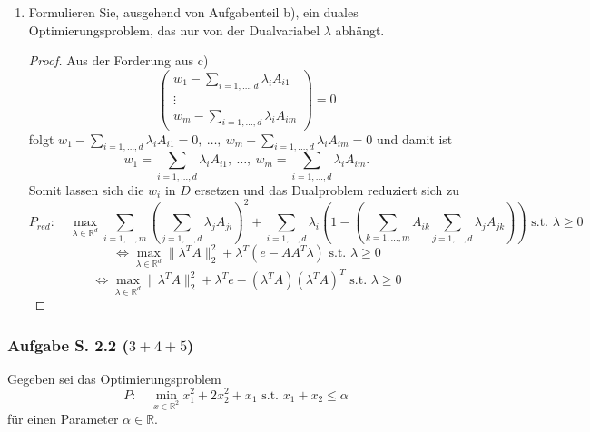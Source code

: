 \documentclass[12pt]{extreport} %
\newcommand{\R}{\mathbb{R}}
\theoremstyle{named}
\theoremstyle{nnamed}
\theoremstyle{itshape}
\theoremstyle{normal}
\begin{document}
\begin{enumerate}
\begin{proof}
			$$ \text{ und } \left(\begin{array}{c} w_1 -\sum_{i=1,\dotsc,d}  \lambda_i A_{i1}  \\ \vdots \\ w_m -\sum_{i=1,\dotsc,d}  \lambda_i A_{im} \end{array}\right) = 0 $$
		\end{proof}
	\item Formulieren Sie, ausgehend von Aufgabenteil b), ein duales Optimierungsproblem, das nur von der Dualvariabel $\lambda$ abhängt.
		\begin{proof}
			Aus der Forderung aus c)
			$$ \left(\begin{array}{c} w_1 -\sum_{i=1,\dotsc,d}  \lambda_i A_{i1}  \\ \vdots \\ w_m -\sum_{i=1,\dotsc,d}  \lambda_i A_{im} \end{array}\right)  = 0 $$
			folgt $w_1 -\sum_{i=1,\dotsc,d}  \lambda_i A_{i1} = 0, ~ \dotsc, ~ w_m -\sum_{i=1,\dotsc,d}  \lambda_i A_{im} = 0$ und damit ist $$w_1 = \sum_{i=1,\dotsc,d}  \lambda_i A_{i1}, ~ \dotsc, ~ w_m = \sum_{i=1,\dotsc,d}  \lambda_i A_{im}. $$
			Somit lassen sich die $w_i$ in $D$ ersetzen und das Dualproblem reduziert sich zu
		 	$$ P_{red}: \quad \max_{\lambda \in \R^d} \sum_{i=1, \dotsc,m } \left( \sum_{j=1, \dotsc, d} \lambda_j A_{ji} \right)^2 + \sum_{i = 1, \dotsc, d} \lambda_i \left( 1 - \left(\sum_{k = 1, \dotsc, m} A_{ik}  \sum_{j=1, \dotsc, d} \lambda_j A_{jk} \right) \right) \text{ s.t. }\lambda \geq 0 $$
		 	$$ \iff \max_{\lambda \in \R^d}\| \lambda^T A \|_2^2 +  \lambda^T \left( e - A A^T \lambda  \right)  \text{ s.t. }\lambda \geq 0$$
		 	$$ \iff \max_{\lambda \in \R^d}\| \lambda^T A \|_2^2 +  \lambda^T e - \left( \lambda^T A \right) \left( \lambda^T A \right)^T  \text{ s.t. }\lambda \geq 0 $$
		\end{proof}
\end{enumerate}

\newpage

\subsubsection{Aufgabe S. 2.2 (\textit{$3 + 4 + 5$})}

Gegeben sei das Optimierungsproblem
$$ P: \quad \min_{x \in \R^2} x_1^2 + 2 x_2^2 + x_1 \text{ s.t. } x_1 + x_2 \leq \alpha $$
für einen Parameter $\alpha \in \R$.
\end{document}
